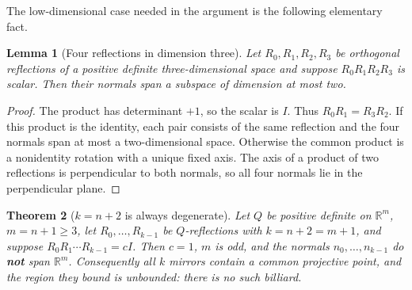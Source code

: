 \documentclass[11pt,a4paper]{article}
\theoremstyle{plain}
\newtheorem{theorem}{Theorem}[section]
\newtheorem{lemma}[theorem]{Lemma}
\theoremstyle{definition}
\theoremstyle{remark}
\begin{document}
The low-dimensional case needed in the argument is the following elementary fact.

\begin{lemma}[Four reflections in dimension three]\label{lem:fourref}
Let $R_0,R_1,R_2,R_3$ be orthogonal reflections of a positive definite
three-dimensional space and suppose $R_0R_1R_2R_3$ is scalar. Then their normals
span a subspace of dimension at most two.
\end{lemma}

\begin{proof}
The product has determinant $+1$, so the scalar is $I$. Thus
$R_0R_1=R_3R_2$. If this product is the identity, each pair consists of the same
reflection and the four normals span at most a two-dimensional space. Otherwise
the common product is a nonidentity rotation with a unique fixed axis. The axis
of a product of two reflections is perpendicular to both normals, so all four
normals lie in the perpendicular plane.
\end{proof}

\begin{theorem}[$k=n+2$ is always degenerate]\label{thm:rigidend}
Let $Q$ be positive definite on $\mathbb{R}^{m}$, $m=n+1\ge3$, let
$R_0,\dots,R_{k-1}$ be $Q$-reflections with $k=n+2=m+1$, and suppose
$R_0R_1\cdots R_{k-1}=cI$. Then $c=1$, $m$ is odd, and the normals
$n_0,\dots,n_{k-1}$ do \textbf{not} span $\mathbb{R}^m$. Consequently all $k$
mirrors contain a common projective point, and the region they bound is unbounded:
there is no such billiard.
\end{theorem}
\end{document}
